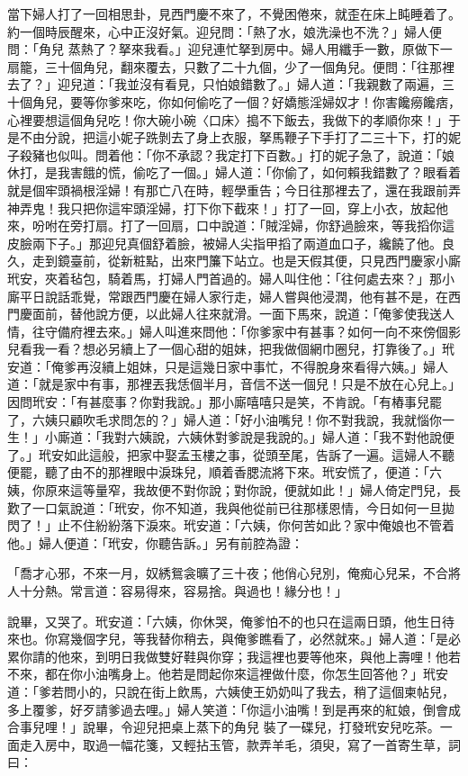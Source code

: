 當下婦人打了一回相思卦，見西門慶不來了，不覺困倦來，就歪在床上盹睡着了。約一個時辰醒來，心中正沒好氣。迎兒問：「熱了水，娘洗澡也不洗？」婦人便問：「角兒 蒸熱了？拏來我看。」迎兒連忙拏到房中。婦人用纖手一數，原做下一扇籠，三十個角兒，翻來覆去，只數了二十九個，少了一個角兒。便問：「往那裡去了？」迎兒道：「我並沒有看見，只怕娘錯數了。」婦人道：「我親數了兩遍，三十個角兒，要等你爹來吃，你如何偷吃了一個？好嬌態淫婦奴才！你害饞癆饞痞，心裡要想這個角兒吃！你大碗小碗〈口床〉搗不下飯去，我做下的孝順你來！」于是不由分說，把這小妮子跣剝去了身上衣服，拏馬鞭子下手打了二三十下，打的妮子殺豬也似叫。問着他：「你不承認？我定打下百數。」打的妮子急了，說道：「娘休打，是我害餓的慌，偷吃了一個。」婦人道：「你偷了，如何賴我錯數了？眼看着就是個牢頭禍根淫婦！有那亡八在時，輕學重告；今日往那裡去了，還在我跟前弄神弄鬼！我只把你這牢頭淫婦，打下你下截來！」打了一回，穿上小衣，放起他來，吩咐在旁打扇。打了一回扇，口中說道：「賊淫婦，你舒過臉來，等我搯你這皮臉兩下子。」那迎兒真個舒着臉，被婦人尖指甲搯了兩道血口子，纔饒了他。良久，走到鏡臺前，從新粧點，出來門簾下站立。也是天假其便，只見西門慶家小廝玳安，夾着毡包，騎着馬，打婦人門首過的。婦人叫住他：「往何處去來？」那小廝平日說話乖覺，常跟西門慶在婦人家行走，婦人嘗與他浸潤，他有甚不是，在西門慶面前，替他說方便，以此婦人往來就滑。一面下馬來，說道：「俺爹使我送人情，往守備府裡去來。」婦人叫進來問他：「你爹家中有甚事？如何一向不來傍個影兒看我一看？想必另續上了一個心甜的姐妹，把我做個網巾圈兒，打靠後了。」玳安道：「俺爹再沒續上姐妹，只是這幾日家中事忙，不得脫身來看得六姨。」婦人道：「就是家中有事，那裡丟我恁個半月，音信不送一個兒！只是不放在心兒上。」因問玳安：「有甚麼事？你對我說。」那小廝嘻嘻只是笑，不肯說。「有樁事兒罷了，六姨只顧吹毛求問怎的？」婦人道：「好小油嘴兒！你不對我說，我就惱你一生！」小廝道：「我對六姨說，六姨休對爹說是我說的。」婦人道：「我不對他說便了。」玳安如此這般，把家中娶孟玉樓之事，從頭至尾，告訴了一遍。這婦人不聽便罷，聽了由不的那裡眼中淚珠兒，順着香腮流將下來。玳安慌了，便道：「六姨，你原來這等量窄，我故便不對你說；對你說，便就如此！」婦人倚定門兒，長歎了一口氣說道：「玳安，你不知道，我與他從前已往那樣恩情，今日如何一旦拋閃了！」止不住紛紛落下淚來。玳安道：「六姨，你何苦如此？家中俺娘也不管着他。」婦人便道：「玳安，你聽告訴。」另有前腔為證：

「喬才心邪，不來一月，奴綉鴛衾曠了三十夜；他俏心兒別，俺痴心兒呆，不合將人十分熱。常言道：容易得來，容易捨。與過也！緣分也！」

說畢，又哭了。玳安道：「六姨，你休哭，俺爹怕不的也只在這兩日頭，他生日待來也。你寫幾個字兒，等我替你稍去，與俺爹瞧看了，必然就來。」婦人道：「是必累你請的他來，到明日我做雙好鞋與你穿；我這裡也要等他來，與他上壽哩！他若不來，都在你小油嘴身上。他若是問起你來這裡做什麼，你怎生回答他？」玳安道：「爹若問小的，只說在街上飲馬，六姨使王奶奶叫了我去，稍了這個柬帖兒，多上覆爹，好歹請爹過去哩。」婦人笑道：「你這小油嘴！到是再來的紅娘，倒會成合事兒哩！」說畢，令迎兒把桌上蒸下的角兒 裝了一碟兒，打發玳安兒吃茶。一面走入房中，取過一幅花箋，又輕拈玉管，款弄羊毛，須臾，寫了一首寄生草，詞曰：

